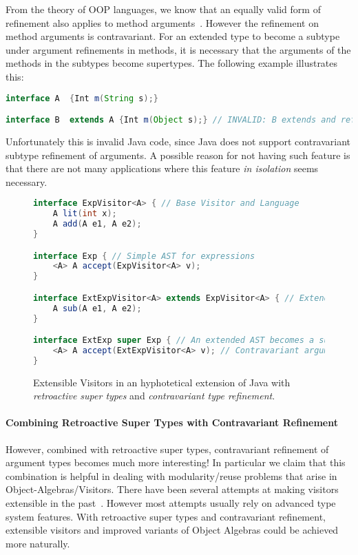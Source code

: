 \noindent From the theory of OOP languages, we know that an equally valid form
of refinement also applies to method arguments~\cite{cardelli1984semantics}.
However the refinement on method arguments is contravariant. For an extended
type to become a subtype under argument refinements in methods, it is necessary
that the arguments of the methods in the subtypes become supertypes. The
following example illustrates this:

\begin{lstlisting}[language=java]
interface A  {Int m(String s);} 

interface B  extends A {Int m(Object s);} // INVALID: B extends and refines the return type of m()
\end{lstlisting}

\noindent Unfortunately this is invalid Java code, since Java
does not support contravariant subtype refinement of arguments. 
A possible reason for not having such feature is that there are not
many applications where this feature \emph{in isolation} seems necessary. 

\begin{figure}
\begin{lstlisting}[language=java]
interface ExpVisitor<A> { // Base Visitor and Language
	A lit(int x);
	A add(A e1, A e2);
}

interface Exp { // Simple AST for expressions
	<A> A accept(ExpVisitor<A> v);
}

interface ExtExpVisitor<A> extends ExpVisitor<A> { // Extended Visitor and Language
	A sub(A e1, A e2);
}

interface ExtExp super Exp { // An extended AST becomes a supertype of the original one
	<A> A accept(ExtExpVisitor<A> v); // Contravariant argument refinement
}
\end{lstlisting}
\caption{Extensible Visitors in an hyphotetical
  extension of Java with \emph{retroactive super types} and \emph{contravariant
  type refinement}.}
\label{fig:JVis}
\end{figure}

\paragraph{Combining Retroactive Super Types with Contravariant Refinement}

However, combined with retroactive super types, contravariant refinement of
argument types becomes much more interesting! In particular we claim that this
combination is helpful in dealing with modularity/reuse problems that arise in
Object-Algebras/Visitors. There have been several attempts at making visitors
extensible in the past~\cite{oliveira09modular,togersen:2004}. However most
attempts usually rely on advanced type system features. With retroactive super
types and contravariant refinement, extensible visitors and improved variants of
Object Algebras could be achieved more naturally.

